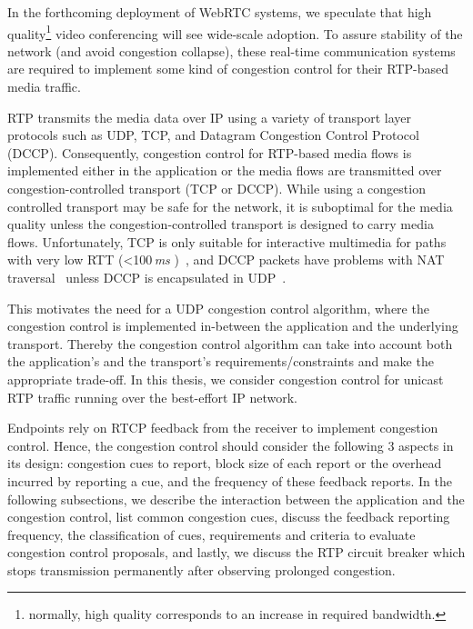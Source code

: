 In the forthcoming deployment of WebRTC systems, we speculate that high
quality\footnote{normally, high quality corresponds to an increase in required
bandwidth.} video conferencing will see wide-scale adoption. To assure
stability of the network (and avoid congestion collapse), these real-time
communication systems are required to implement some kind of congestion
control for their RTP-based media traffic.

RTP transmits the media data over IP using a variety of transport layer
protocols such as UDP, TCP, and Datagram Congestion Control Protocol (DCCP).
Consequently, congestion control for RTP-based media flows is implemented
either in the application or the media flows are transmitted over
congestion-controlled transport (TCP or DCCP). While using a congestion
controlled transport may be safe for the network, it is suboptimal for the
media quality unless the congestion-controlled transport is designed to carry
media flows. Unfortunately, TCP is only suitable for interactive multimedia
for paths with very low RTT (<100\,\emph{ms} )~\cite{Brosh:tcp-real-time}, and
DCCP packets have problems with NAT traversal~\cite{schier:DCCP} unless DCCP is
encapsulated in UDP~\cite{RFC6773}.

This motivates the need for a UDP congestion control algorithm, where the
congestion control is implemented in-between the application and the
underlying transport. Thereby the congestion control algorithm can take into
account both the application's and the transport's requirements/constraints
and make the appropriate trade-off. In this thesis, we consider congestion
control for unicast RTP traffic running over the best-effort IP network.


Endpoints rely on RTCP feedback from the receiver to implement congestion
control. Hence, the congestion control should consider the following 3 aspects
in its design: congestion cues to report, block size of each report or the
overhead incurred by reporting a cue, and the frequency of these feedback
reports. In the following subsections, we describe the interaction between the
application and the congestion control, list common congestion cues, discuss
the feedback reporting frequency, the classification of cues, requirements and
criteria to evaluate congestion control proposals, and lastly, we discuss the
RTP circuit breaker which stops transmission permanently after observing
prolonged congestion.

